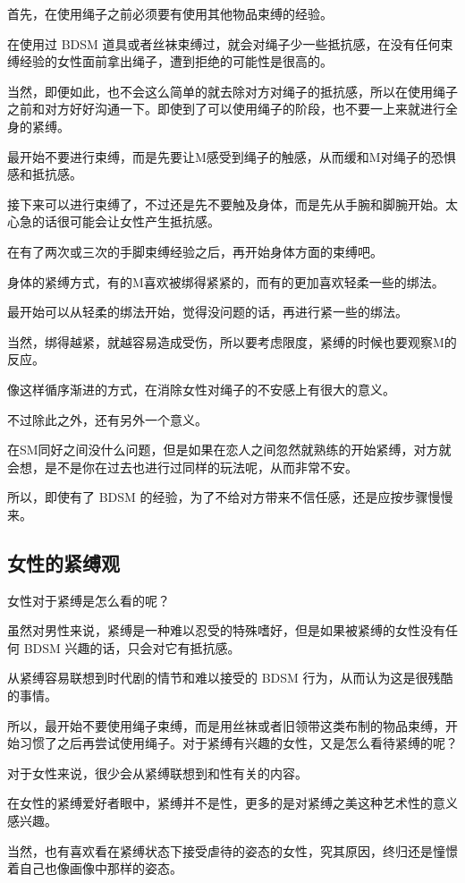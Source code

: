 \documentclass[12pt,UTF8]{ctexbook}
\begin{document}
首先，在使用绳子之前必须要有使用其他物品束缚的经验。

在使用过 BDSM 道具或者丝袜束缚过，就会对绳子少一些抵抗感，在没有任何束缚经验的女性面前拿出绳子，遭到拒绝的可能性是很高的。

当然，即便如此，也不会这么简单的就去除对方对绳子的抵抗感，所以在使用绳子之前和对方好好沟通一下。即使到了可以使用绳子的阶段，也不要一上来就进行全身的紧缚。

最开始不要进行束缚，而是先要让M感受到绳子的触感，从而缓和M对绳子的恐惧感和抵抗感。

接下来可以进行束缚了，不过还是先不要触及身体，而是先从手腕和脚腕开始。太心急的话很可能会让女性产生抵抗感。

在有了两次或三次的手脚束缚经验之后，再开始身体方面的束缚吧。

身体的紧缚方式，有的M喜欢被绑得紧紧的，而有的更加喜欢轻柔一些的绑法。

最开始可以从轻柔的绑法开始，觉得没问题的话，再进行紧一些的绑法。

当然，绑得越紧，就越容易造成受伤，所以要考虑限度，紧缚的时候也要观察M的反应。

像这样循序渐进的方式，在消除女性对绳子的不安感上有很大的意义。

不过除此之外，还有另外一个意义。

在SM同好之间没什么问题，但是如果在恋人之间忽然就熟练的开始紧缚，对方就会想，是不是你在过去也进行过同样的玩法呢，从而非常不安。

所以，即使有了 BDSM 的经验，为了不给对方带来不信任感，还是应按步骤慢慢来。

\subsection{女性的紧缚观}

女性对于紧缚是怎么看的呢？

虽然对男性来说，紧缚是一种难以忍受的特殊嗜好，但是如果被紧缚的女性没有任何 BDSM 兴趣的话，只会对它有抵抗感。

从紧缚容易联想到时代剧的情节和难以接受的 BDSM 行为，从而认为这是很残酷的事情。

所以，最开始不要使用绳子束缚，而是用丝袜或者旧领带这类布制的物品束缚，开始习惯了之后再尝试使用绳子。对于紧缚有兴趣的女性，又是怎么看待紧缚的呢？

对于女性来说，很少会从紧缚联想到和性有关的内容。

在女性的紧缚爱好者眼中，紧缚并不是性，更多的是对紧缚之美这种艺术性的意义感兴趣。

当然，也有喜欢看在紧缚状态下接受虐待的姿态的女性，究其原因，终归还是憧憬着自己也像画像中那样的姿态。
\end{document}
